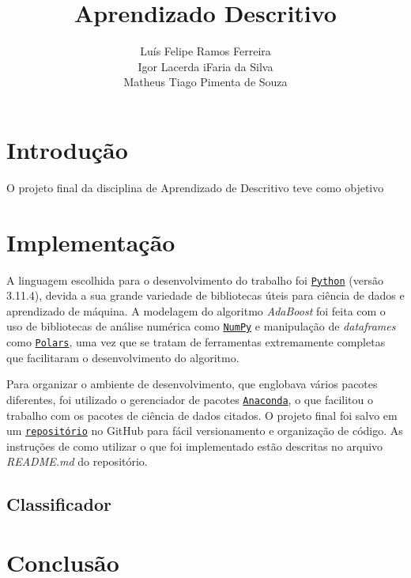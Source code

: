 \documentclass{article}
\title{Aprendizado Descritivo}
\author{Luís Felipe Ramos Ferreira \\  Igor Lacerda iFaria da Silva \\ Matheus Tiago Pimenta de Souza}
\begin{document}
\maketitle

\section{Introdução}

O projeto final da disciplina de Aprendizado de Descritivo teve como objetivo

\section{Implementação}

A linguagem escolhida para o desenvolvimento do trabalho foi
\href{https://www.python.org/}{\texttt{Python}} (versão 3.11.4), devida a sua
grande variedade de bibliotecas úteis para ciência de dados e aprendizado de
máquina.
A modelagem do algoritmo \textit{AdaBoost} foi feita com o uso de bibliotecas
de análise numérica como \href{https://numpy.org/}{\texttt{NumPy}} e manipulação de \textit{dataframes} como
\href{https://pola.rs/}{\texttt{Polars}},
uma vez que se tratam de ferramentas extremamente completas que facilitaram o
desenvolvimento do algoritmo.

Para organizar o ambiente de desenvolvimento, que englobava vários pacotes
diferentes, foi utilizado o gerenciador de pacotes
\href{https://www.anaconda.com/}{\texttt{Anaconda}}, o que facilitou o trabalho
com os pacotes de ciência de dados citados. O projeto final foi salvo em um
\href{https://github.com/lframosferreira/projeto-ad}{\texttt{repositório}}
no GitHub para fácil versionamento e organização de código. As instruções de
como
utilizar o que foi implementado estão descritas no arquivo \textit{README.md}
do repositório.

\subsection{Classificador}

\section{Conclusão}
\end{document}
